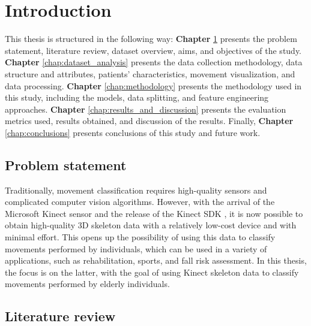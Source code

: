 \hypersetup{colorlinks=true, linkcolor=blue, citecolor=red}

\chapter{Introduction} \label{chap:introduction}

   This thesis is structured in the following way: \textbf{Chapter} \ref{chap:introduction} presents the problem statement, literature review, dataset overview, aims, and objectives of the study. \textbf{Chapter} \ref{chap:dataset_analysis} presents the data collection methodology, data structure and attributes, patients' characteristics, movement visualization, and data processing. \textbf{Chapter} \ref{chap:methodology} presents the methodology used in this study, including the models, data splitting, and feature engineering approaches. \textbf{Chapter} \ref{chap:results_and_discussion} presents the evaluation metrics used, results obtained, and discussion of the results. Finally, \textbf{Chapter} \ref{chap:conclusions} presents conclusions of this study and future work.

   \section{Problem statement}

      Traditionally, movement classification requires high-quality sensors and complicated computer vision algorithms. However, with the arrival of the Microsoft Kinect sensor and the release of the Kinect SDK \cite{jana_kinect_2012}, it is now possible to obtain high-quality 3D skeleton data with a relatively low-cost device and with minimal effort. This opens up the possibility of using this data to classify movements performed by individuals, which can be used in a variety of applications, such as rehabilitation, sports, and fall risk assessment. In this thesis, the focus is on the latter, with the goal of using Kinect skeleton data to classify movements performed by elderly individuals.
  
   \section{Literature review}

